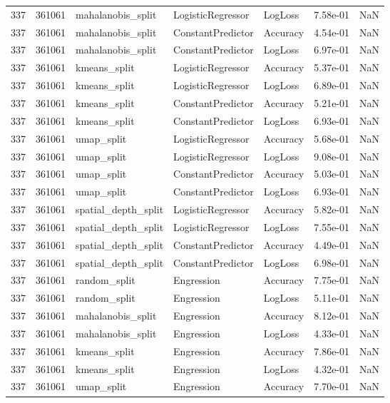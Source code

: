 \begin{tabular}{rrlllrr}
337 & 361061 & mahalanobis\_split & LogisticRegressor & LogLoss & 7.58e-01 & NaN \\
337 & 361061 & mahalanobis\_split & ConstantPredictor & Accuracy & 4.54e-01 & NaN \\
337 & 361061 & mahalanobis\_split & ConstantPredictor & LogLoss & 6.97e-01 & NaN \\
337 & 361061 & kmeans\_split & LogisticRegressor & Accuracy & 5.37e-01 & NaN \\
337 & 361061 & kmeans\_split & LogisticRegressor & LogLoss & 6.89e-01 & NaN \\
337 & 361061 & kmeans\_split & ConstantPredictor & Accuracy & 5.21e-01 & NaN \\
337 & 361061 & kmeans\_split & ConstantPredictor & LogLoss & 6.93e-01 & NaN \\
337 & 361061 & umap\_split & LogisticRegressor & Accuracy & 5.68e-01 & NaN \\
337 & 361061 & umap\_split & LogisticRegressor & LogLoss & 9.08e-01 & NaN \\
337 & 361061 & umap\_split & ConstantPredictor & Accuracy & 5.03e-01 & NaN \\
337 & 361061 & umap\_split & ConstantPredictor & LogLoss & 6.93e-01 & NaN \\
337 & 361061 & spatial\_depth\_split & LogisticRegressor & Accuracy & 5.82e-01 & NaN \\
337 & 361061 & spatial\_depth\_split & LogisticRegressor & LogLoss & 7.55e-01 & NaN \\
337 & 361061 & spatial\_depth\_split & ConstantPredictor & Accuracy & 4.49e-01 & NaN \\
337 & 361061 & spatial\_depth\_split & ConstantPredictor & LogLoss & 6.98e-01 & NaN \\
337 & 361061 & random\_split & Engression & Accuracy & 7.75e-01 & NaN \\
337 & 361061 & random\_split & Engression & LogLoss & 5.11e-01 & NaN \\
337 & 361061 & mahalanobis\_split & Engression & Accuracy & 8.12e-01 & NaN \\
337 & 361061 & mahalanobis\_split & Engression & LogLoss & 4.33e-01 & NaN \\
337 & 361061 & kmeans\_split & Engression & Accuracy & 7.86e-01 & NaN \\
337 & 361061 & kmeans\_split & Engression & LogLoss & 4.32e-01 & NaN \\
337 & 361061 & umap\_split & Engression & Accuracy & 7.70e-01 & NaN \\

\end{tabular}
